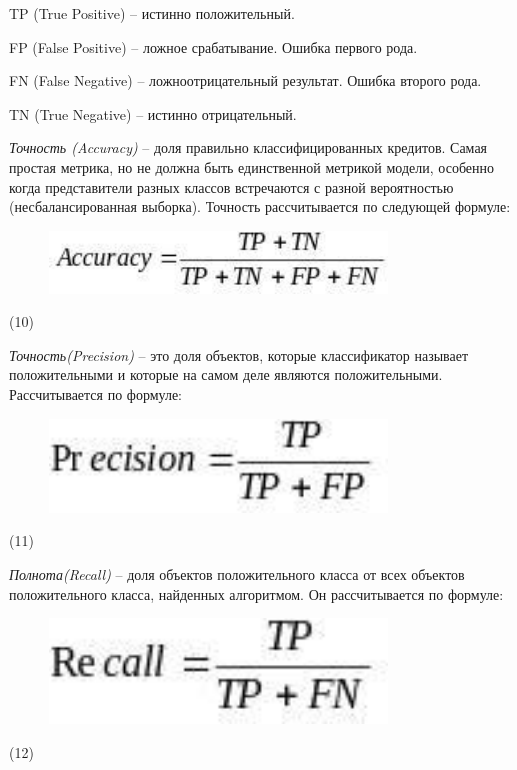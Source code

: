 TP (True Positive) -- истинно положительный.

FP (False Positive) -- ложное срабатывание. Ошибка первого рода.

FN (False Negative) -- ложноотрицательный результат. Ошибка второго
рода.

TN (True Negative) -- истинно отрицательный.

\emph{Точность (Accuracy)} -- доля правильно классифицированных
кредитов. Самая простая метрика, но не должна быть единственной метрикой
модели, особенно когда представители разных классов встречаются с разной
вероятностью (несбалансированная выборка). Точность рассчитывается по
следующей формуле:

\begin{figure}[H]
	\centering
	\includegraphics[width=0.8\textwidth]{assets/116}
	\caption*{}
\end{figure} (10)

\emph{Точность(Precision)} -- это доля объектов, которые классификатор
называет положительными и которые на самом деле являются положительными.
Рассчитывается по формуле:

\begin{figure}[H]
	\centering
	\includegraphics[width=0.8\textwidth]{assets/117}
	\caption*{}
\end{figure} (11)

\emph{Полнота(Recall)} -- доля объектов положительного класса от всех
объектов положительного класса, найденных алгоритмом. Он рассчитывается
по формуле:

\begin{figure}[H]
	\centering
	\includegraphics[width=0.8\textwidth]{assets/118}
	\caption*{}
\end{figure} (12)

